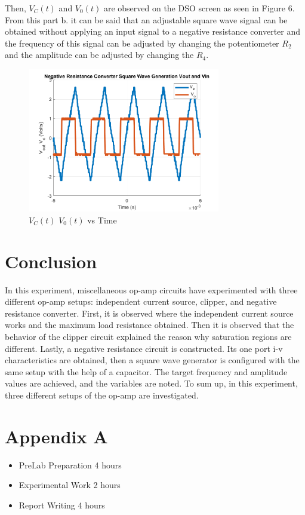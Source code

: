 \documentclass[letterpaper,12pt]{article}
\begin{document}
Then, \(V_C(t)\) and \(V_0(t)\) are observed on the DSO screen as seen in Figure 6.
From this part b. it can be said that an adjustable square wave signal can be obtained without applying an input signal to a negative resistance converter and the frequency of this signal can be adjusted by changing the potentiometer \(R_2\) and the amplitude can be adjusted by changing the \(R_4\).
\begin{figure}[H]
    \centering
    \includegraphics[width = 0.75\textwidth]{3b.png}
    \caption{\(V_C(t)\)  \(V_0(t)\) vs Time}
\end{figure} 


\section{Conclusion}
In this experiment, miscellaneous op-amp circuits have experimented with three different op-amp setups: independent current source, clipper, and negative resistance converter. First, it is observed where the independent current source works and the maximum load resistance obtained. Then it is observed that the behavior of the clipper circuit explained the reason why saturation regions are different. Lastly, a negative resistance circuit is constructed. Its one port i-v characteristics are obtained, then a square wave generator is configured with the same setup with the help of a capacitor. The target frequency and amplitude values are achieved, and the variables are noted. To sum up, in this experiment, three different setups of the op-amp are investigated.
\section*{Appendix A}
\begin{itemize}
    \item PreLab Preparation 4 hours
    \item Experimental Work 2  hours
    \item Report Writing 4 hours
\end{itemize}
\end{document}
